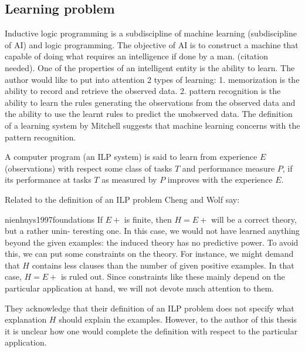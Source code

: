 \subsection{Learning problem}
Inductive logic programming is a subdiscipline of machine learning (subdiscipline of AI) and logic programming. The objective of AI is to construct a machine that capable of doing what requires an intelligence if done by a man. (citation needed). One of the properties of an intelligent entity is the ability to learn. The author would like to put into attention 2 types of learning:
1. memorization is the ability to record and retrieve the observed data.
2. pattern recognition is the ability to learn the rules generating the observations from the observed data and the ability to use the learnt rules to predict the unobserved data. The definition of a learning system by Mitchell suggests that machine learning concerns with the pattern recognition.

\begin{defn}\cite{mitchell1997machine}
A computer program (an ILP system) is said to learn from experience $E$ (observations)
with respect some class of tasks $T$ and performance measure $P$,
if its performance at tasks $T$ as measured by $P$ improves with the experience $E$.
\end{defn}

Related to the definition of an ILP problem Cheng and Wolf say:

\begin{cite}{nienhuys1997foundations}
If $E+$ is finite, then $H = E+$ will be a correct theory, but a rather unin-
teresting one. In this case, we would not have learned anything beyond the
given examples: the induced theory has no predictive power. To avoid this,
we can put some constraints on the theory. For instance, we might demand
that $H$ contains less clauses than the number of given positive examples. In
that case, $H = E+$ is ruled out. Since constraints like these mainly depend
on the particular application at hand, we will not devote much attention to
them.
\end{cite}

They acknowledge that their definition of an ILP problem does not specify what explanation $H$ should explain the examples. However, to the author of this thesis it is unclear how one would complete the definition with respect to the particular application.

